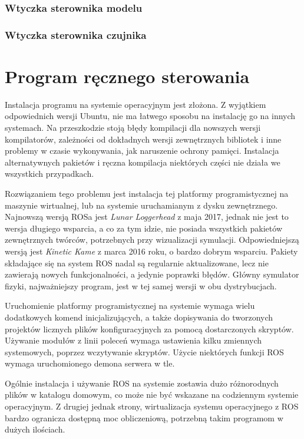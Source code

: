 		\subsubsection{Wtyczka sterownika modelu}
		\subsubsection{Wtyczka sterownika czujnika}
	
\section{Program ręcznego sterowania}



% 

Instalacja programu na systemie operacyjnym jest złożona.
	Z wyjątkiem odpowiednich wersji Ubuntu, nie ma łatwego sposobu na instalację go na innych systemach.
	Na przeszkodzie stoją błędy kompilacji dla nowszych wersji kompilatorów, zależności od dokładnych wersji zewnętrznych bibliotek i 
	inne problemy w czasie wykonywania, jak naruszenie ochrony pamięci. 
	Instalacja alternatywnych pakietów i ręczna kompilacja niektórych części nie działa we wszystkich przypadkach.

	Rozwiązaniem tego problemu jest instalacja tej platformy programistycznej na maszynie wirtualnej, lub na systemie uruchamianym z dysku zewnętrznego. 
	Najnowszą wersją ROSa jest \emph{Lunar Loggerhead} z maja 2017, jednak nie jest to wersja długiego wsparcia, a co za tym idzie, nie posiada wszystkich
	pakietów zewnętrznych twórców, potrzebnych przy wizualizacji symulacji.
	Odpowiedniejszą wersją jest \emph{Kinetic Kame} z marca 2016 roku, o bardzo dobrym wsparciu.
	Pakiety składające się na system ROS nadal są regularnie aktualizowane, lecz nie zawierają nowych funkcjonalności, a jedynie poprawki błędów.
	Główny symulator fizyki, najważniejszy program, jest w tej samej wersji w obu dystrybucjach.

	Uruchomienie platformy programistycznej na systemie wymaga wielu dodatkowych komend inicjalizujących, 
	a także dopisywania do tworzonych projektów licznych plików konfiguracyjnych za pomocą dostarczonych skryptów.
	Używanie modułów z linii poleceń wymaga ustawienia kilku zmiennych systemowych, poprzez wczytywanie skryptów.
	Użycie niektórych funkcji ROS wymaga uruchomionego demona serwera w tle.

	Ogólnie instalacja i używanie ROS na systemie zostawia dużo różnorodnych plików w katalogu domowym, co może nie być wskazane na codziennym systemie operacyjnym.
	Z drugiej jednak strony, wirtualizacja systemu operacyjnego z ROS bardzo ogranicza dostępną moc obliczeniową, potrzebną takim programom w dużych ilościach.
